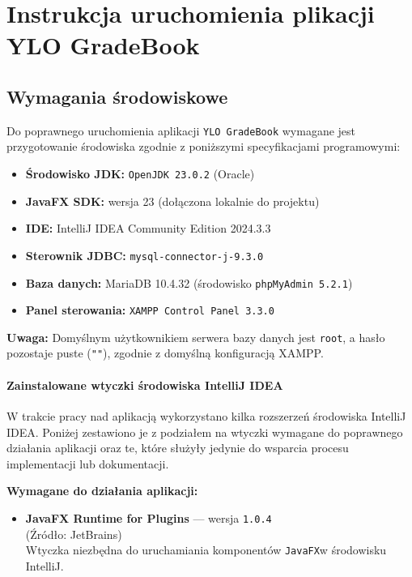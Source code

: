 \chapter{Instrukcja uruchomienia plikacji YLO GradeBook}
\label{cha:instrukcja}


\section{Wymagania środowiskowe}

Do poprawnego uruchomienia aplikacji \texttt{YLO GradeBook} wymagane jest przygotowanie środowiska zgodnie z poniższymi specyfikacjami programowymi:

\begin{itemize}
    \item \textbf{Środowisko JDK:} \texttt{OpenJDK 23.0.2} (Oracle)
    \item \textbf{JavaFX SDK:} wersja 23 (dołączona lokalnie do projektu)
    \item \textbf{IDE:} IntelliJ IDEA Community Edition 2024.3.3
    \item \textbf{Sterownik JDBC:} \texttt{mysql-connector-j-9.3.0}
    \item \textbf{Baza danych:} MariaDB 10.4.32 (środowisko \texttt{phpMyAdmin 5.2.1})
    \item \textbf{Panel sterowania:} \texttt{XAMPP Control Panel 3.3.0}
\end{itemize}

\textbf{Uwaga:} Domyślnym użytkownikiem serwera bazy danych jest \texttt{root}, a hasło pozostaje puste (\texttt{""}), zgodnie z domyślną konfiguracją XAMPP.

\subsubsection*{Zainstalowane wtyczki środowiska IntelliJ IDEA}

W trakcie pracy nad aplikacją wykorzystano kilka rozszerzeń środowiska IntelliJ IDEA. Poniżej zestawiono je z podziałem na wtyczki wymagane do poprawnego działania aplikacji oraz te, które służyły jedynie do wsparcia procesu implementacji lub dokumentacji.

\textbf{Wymagane do działania aplikacji:}
\begin{itemize}
    \item \textbf{JavaFX Runtime for Plugins} — wersja \texttt{1.0.4} \\
    (Źródło: JetBrains) \\
    Wtyczka niezbędna do uruchamiania komponentów \texttt{JavaFX}w środowisku IntelliJ.
\end{itemize}

